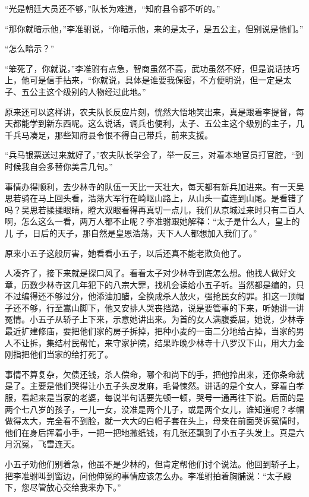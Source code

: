 “光是朝廷大员还不够，”队长为难道，“知府县令都不听的。”

“那你就暗示他，”李准驸说，“你暗示他，来的是太子，是五公主，但别说是他们。”

“怎么暗示？”

“笨死了，你就说，”李准驸有点急，智商虽然不高，武功虽然不好，但是说话技巧上，他可是信手拈来，“你就说，具体是谁要我保密，不方便明说，但一定是太子、五公主这个级别的人物经过此地。”

原来还可以这样讲，农夫队长反应片刻，恍然大悟地笑出来，真是跟着李提督，每天都能学到新东西呢。这么说话，调兵也便利，太子、五公主这个级别的主子，几千兵马凑足，那些知府县令恨不得自己带兵，前来支援。

“兵马银票送过来就好了，”农夫队长学会了，举一反三，对着本地官员打官腔，“到时候我自会多替你美言几句。”

事情办得顺利，去少林寺的队伍一天比一天壮大，每天都有新兵加进来。有一天吴思若骑在马上回头看，浩荡大军行在崎岖山路上，从山头一直连到山尾。是看错了吗？吴思若揉揉眼睛，瞪大双眼看得再真切一点儿，我们从京城过来时只有二百人啊，怎么这么一看，两万人都不止呢？李准驸跟她解释：“太子是什么人，皇上的儿
子，日后的天子，那自然是皇恩浩荡，天下人人都想加入我们了。”

原来小五子这般厉害，她看看小五子，以后还真不能老欺负他了。

人凑齐了，接下来就是探口风了。看看太子对少林寺到底怎么想。他找人做好文章，历数少林寺这几年犯下的八宗大罪，找机会读给小五子听。当然都是编的，只不过编得还不够过分，他添油加醋，全换成杀人放火，强抢民女的罪。扣这一顶帽子还不够，行至嵩山脚下，他又安排人哭丧挡路，说是要管事的下来，听她讲一讲冤情。小五子从轿子上下来，示意她讲出来。为首的女人满腹委屈，她说，少林寺最近扩建修庙，要把他们家的房子拆掉，把种小麦的一亩二分地给占掉，当家的男人不让拆，集结村民帮忙，来守家护院，结果昨晚少林寺十八罗汉下山，用大力金刚指把他们当家的给打死了。

事情不算复杂，欠债还钱，杀人偿命，哪个和尚下的手，把他拎出来，还你条命就是了。主要是他们哭得让小五子头皮发麻，毛骨悚然。讲话的是个女人，穿着白孝服，看起来是当家的老婆，每说半句话要先顿一顿，哭号一通再往下说。后面的是两个七八岁的孩子，一儿一女，没准是两个儿子，或是两个女儿，谁知道呢？孝帽做得太大，完全看不到脸，就一大大的白帽子套在头上，母亲在前面哭诉冤情时，他们在身后挥着小手，一把一把地撒纸钱，有几张还飘到了小五子头发上。真是六月沉冤，飞雪连天。

小五子劝他们别着急，他虽不是少林的，但肯定帮他们讨个说法。他回到轿子上，把李准驸叫到窗边，问他伸冤的事情应该怎么办。李准驸拍着胸脯说：“太子殿下，您尽管放心交给我来办下。”

